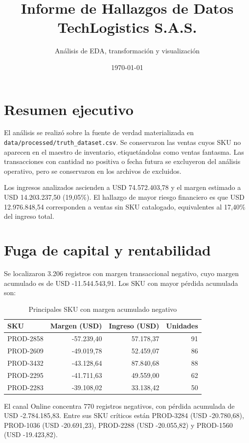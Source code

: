 \documentclass[11pt,a4paper]{article}
\title{Informe de Hallazgos de Datos\\TechLogistics S.A.S.}
\author{Análisis de EDA, transformación y visualización}
\date{\today}
\begin{document}
\maketitle

\section*{Resumen ejecutivo}
El análisis se realizó sobre la fuente de verdad materializada en
\texttt{data/processed/truth\_dataset.csv}. Se conservaron las ventas cuyos SKU no
aparecen en el maestro de inventario, etiquetándolas como ventas fantasma. Las
transacciones con cantidad no positiva o fecha futura se excluyeron del análisis
operativo, pero se conservaron en los archivos de excluidos.

Los ingresos analizados ascienden a USD 74.572.403,78 y el margen estimado a
USD 14.203.237,50 (19,05\%). El hallazgo de mayor riesgo financiero es que
USD 12.976.848,54 corresponden a ventas sin SKU catalogado, equivalentes al
17,40\% del ingreso total.

\section{Fuga de capital y rentabilidad}
Se localizaron 3.206 registros con margen transaccional negativo, cuyo margen
acumulado es de USD -11.544.543,91. Los SKU con mayor pérdida acumulada son:

\begin{table}[h]
\centering
\caption{Principales SKU con margen acumulado negativo}
\begin{tabular}{lrrr}
\toprule
SKU & Margen (USD) & Ingreso (USD) & Unidades \\
\midrule
PROD-2858 & -57.239,40 & 57.178,37 & 91 \\
PROD-2609 & -49.019,78 & 52.459,07 & 86 \\
PROD-3432 & -43.128,64 & 87.840,68 & 88 \\
PROD-2295 & -41.711,63 & 49.559,00 & 62 \\
PROD-2283 & -39.108,02 & 33.138,42 & 50 \\
\bottomrule
\end{tabular}
\end{table}

El canal Online concentra 770 registros negativos, con pérdida acumulada de
USD -2.784.185,83. Entre sus SKU críticos están PROD-3284 (USD -20.780,68),
PROD-1036 (USD -20.691,23), PROD-2288 (USD -20.055,82) y PROD-1560
(USD -19.423,82).
\end{document}
